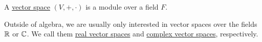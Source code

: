 \begin{definition}\label{def:vector_space}
  A \uline{vector space} $(V, +, \cdot)$ is a module over a field $F$.
\end{definition}

\begin{note}\label{note:real_vector_space}
  Outside of algebra, we are usually only interested in vector spaces over the fields $\mathbb R$ or $\mathbb C$. We call them \uline{real vector spaces} and \uline{complex vector spaces}, respectively.
\end{note}

